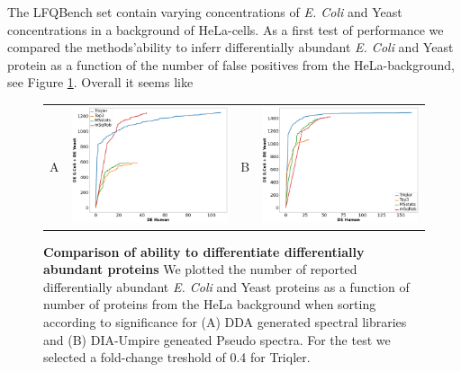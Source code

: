 \documentclass[10pt,letterpaper]{article}
\begin{document}
The LFQBench set contain varying concentrations of {\em E. Coli} and Yeast concentrations in a background of HeLa-cells. As a first test of performance we compared the methods'ability to inferr differentially abundant {\em E. Coli} and Yeast protein as a function of the number of false positives from the HeLa-background, see Figure \ref{fig:diff_vs_hela}. Overall it seems like 


\begin{figure}[hbt]
    \centering
    \begin{tabular}{lclc} 

        A & \includegraphics[width=0.4\linewidth]{../../result/report_plots/osw_de_all_new.png} & 
        B & \includegraphics[width=0.4\linewidth]{../../result/report_plots/diann_de_all_new.png} \\ 

    \end{tabular}
    \caption{{\bf Comparison of ability to differentiate differentially abundant proteins} We plotted the number of reported differentially abundant  {\em E. Coli} and Yeast proteins as a function of number of proteins from the HeLa background when sorting according to significance for (A) DDA generated spectral libraries and (B) DIA-Umpire geneated Pseudo spectra. For the test we selected a fold-change treshold of 0.4 for Triqler. \label{fig:diff_vs_hela}}
\end{figure}
\end{document}
